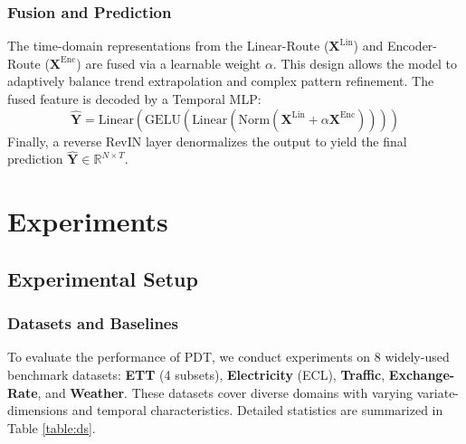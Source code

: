 \documentclass[final,3p,times]{elsarticle}
\begin{document}
\subsubsection{Fusion and Prediction}
The time-domain representations from the Linear-Route ($\mathbf{X}^{\text{Lin}}$) and Encoder-Route ($\mathbf{X}^{\text{Enc}}$) are fused via a learnable weight $\alpha$. This design allows the model to adaptively balance trend extrapolation and complex pattern refinement. The fused feature is decoded by a Temporal MLP:
\begin{equation}
    \hat{\mathbf{Y}} = \text{Linear}(\text{GELU}(\text{Linear}(\text{Norm}(\mathbf{X}^{\text{Lin}} + \alpha \mathbf{X}^{\text{Enc}}))))
\end{equation}
Finally, a reverse RevIN layer denormalizes the output to yield the final prediction $\hat{\mathbf{Y}} \in \mathbb{R}^{N \times T}$.



\section{Experiments}

\subsection{Experimental Setup}

\subsubsection{Datasets and Baselines}

To evaluate the performance of PDT, we conduct experiments on 8 widely-used benchmark datasets: \textbf{ETT} (4 subsets), \textbf{Electricity} (ECL), \textbf{Traffic}, \textbf{Exchange-Rate}, and \textbf{Weather}. These datasets cover diverse domains with varying variate-dimensions and temporal characteristics. Detailed statistics are summarized in Table \ref{table:ds}.
\end{document}
